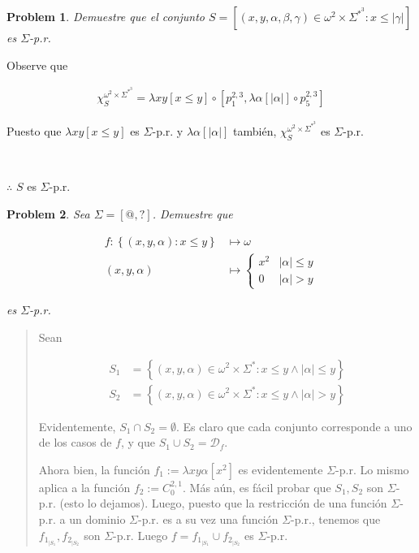 \documentclass[a4paper, 12pt]{article}
\newtheorem{problem}{Problem}
\newtheorem{problem}{Problem}
\begin{document}
\begin{problem}
    Demuestre que el conjunto $ S = \left[ (x, y, \alpha, \beta, \gamma) \in
    \omega^2 \times \Sigma^{*}^3 : x \leq |\gamma| \right] $ es $\Sigma$-p.r. 
\end{problem}

Observe que 

\begin{align*}
    \chi_S^{\omega^2 \times \Sigma^{*}^3} = \lambda xy \left[ x \leq y  \right]
    \circ \left[ p_1^{2, 3}, \lambda \alpha \left[ |\alpha|  \right] \circ
    p_5^{2, 3} \right] 
\end{align*}

Puesto que $\lambda xy \left[ x \leq y  \right]$ es $\Sigma$-p.r. y $\lambda
\alpha \left[ |\alpha|  \right]$ también, $\chi_S^{\omega^2 \times
\Sigma^{*}^3}$ es $\Sigma$-p.r. 

~

$\therefore $ $S$ es $\Sigma$-p.r. 

\begin{problem}
    Sea $\Sigma = \left[ @, ? \right] $. Demuestre que 

    \begin{align*}
        f :  \left\{ (x, y, \alpha) : x \leq y \right\}    &\mapsto \omega \\ 
        (x, y, \alpha) &\mapsto  \begin{cases}
            x^2 & |\alpha| \leq y \\ 
            0 & |\alpha| > y
        \end{cases}
    \end{align*}

    es $\Sigma$-p.r. 
\end{problem}


\small
\begin{quote}

Sean 

\begin{align*}
    S_1 &= \left\{ (x, y, \alpha) \in \omega^2 \times \Sigma^{*} : x \leq y
\land |\alpha| \leq y \right\} \\ 
        S_2 &= \left\{ (x, y, \alpha) \in \omega^2 \times \Sigma^{*} : x \leq y
\land |\alpha| > y \right\} 
\end{align*}

Evidentemente, $S_1 \cap S_2 = \emptyset$. Es claro que cada conjunto
corresponde a uno de los casos de $f$, y que $S_1 \cup S_2 = \mathcal{D}_f$.

Ahora bien, la función $f_1 := \lambda xy\alpha \left[ x^2  \right]$ es
evidentemente $\Sigma$-p.r. Lo mismo aplica a la función $f_2 := C_0^{2, 1}$. Más aún,
es fácil probar que $S_1, S_2$ son $\Sigma$-p.r. (esto lo dejamos). Luego,
puesto que la restricción de una función $\Sigma$-p.r. a un dominio
$\Sigma$-p.r. es a su vez una función $\Sigma$-p.r., tenemos que $f_1_{\mid S_1},
f_2_{\mid S_2}$ son $\Sigma$-p.r.  Luego $f = f_1_{\mid S_1} \cup f_2_{\mid S_2}$ es $\Sigma$-p.r. 

\end{quote}
\normalsize
\end{document}
